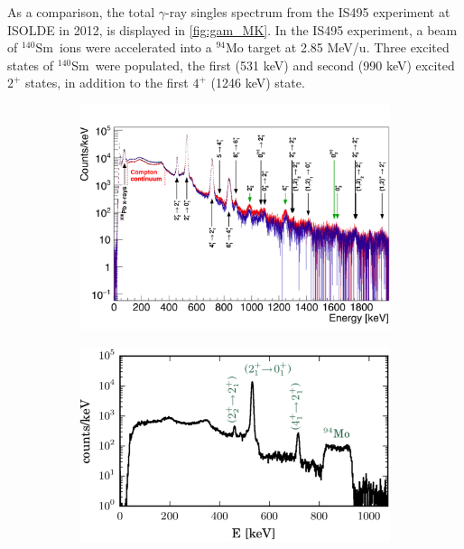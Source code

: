 \documentclass[twoside,english]{uiofysmaster/uiofysmaster}
\newcommand{\blank}[1]{\hspace*{#1}} %
\newcommand{\Sm}{$^{140}$Sm} %
\newcommand{\ga}{$\gamma$}
\let\orgautoref\autoref
\renewcommand{\autoref}
        {%
		 \def\sectionautorefname{Section}%
		 \def\subsectionautorefname{Section}%
		 \def\subsubsectionautorefname{Section}%
		 \def\chapterautorefname{Chapter}%
          \orgautoref}
\begin{document}
As a comparison, the total \ga-ray singles spectrum from the IS495 experiment at ISOLDE in 2012, is displayed in \autoref{fig:gam_MK}.
In the IS495 experiment, a beam of \Sm\ ions were accelerated into a $^{94}$Mo target at 2.85 MeV/u.
Three excited states of \Sm\ were populated, the first (531 keV) and second (990 keV) excited $2^+$ states, in addition to the first $4^+$ (1246 keV) state.

\begin{figure}[H]
	\centering
	\begin{subfigure}[t]{\textwidth}
		\centering
		\includegraphics[width=\textwidth]{../Plots/plotting/gam_dcB_s_and_a.png}
		\caption{}
		\label{fig:gam_dcB}
	\end{subfigure}
	\begin{subfigure}[t]{0.8\textwidth}
		\includegraphics[width=\textwidth]{Images/gam_MK.png}

\end{subfigure}
\end{figure}
\end{document}
